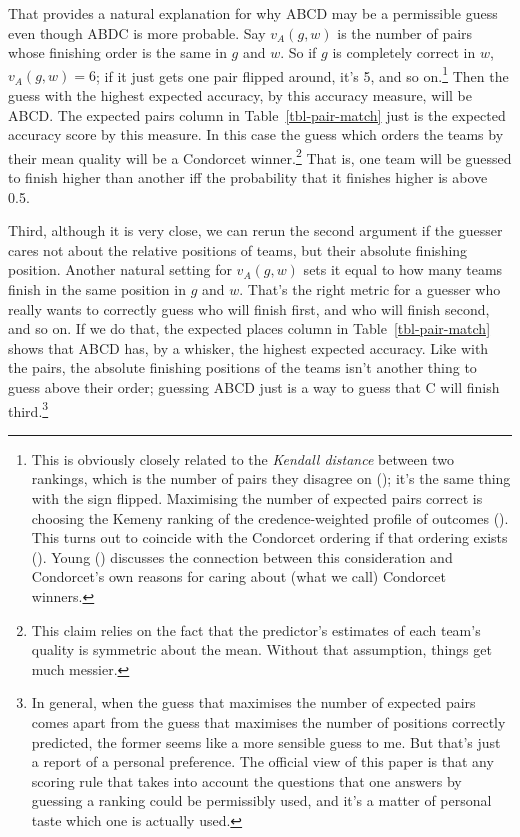 \documentclass[
  11pt,
  letterpaper,
  DIV=11,
  numbers=noendperiod,
  twoside]{scrartcl}
\begin{document}
That provides a natural explanation for why ABCD may be a permissible
guess even though ABDC is more probable. Say \(v_A(g, w)\) is the number
of pairs whose finishing order is the same in \(g\) and \(w\). So if
\(g\) is completely correct in \(w\), \(v_A(g, w) = 6\); if it just gets
one pair flipped around, it's 5, and so on.\footnote{This is obviously
  closely related to the \emph{Kendall distance} between two rankings,
  which is the number of pairs they disagree on
  (); it's the same thing with
  the sign flipped. Maximising the number of expected pairs correct is
  choosing the Kemeny ranking of the credence-weighted profile of
  outcomes (). This turns out to
  coincide with the Condorcet ordering if that ordering exists
  (). Young
  () discusses the connection between this
  consideration and Condorcet's own reasons for caring about (what we
  call) Condorcet winners.} Then the guess with the highest expected
accuracy, by this accuracy measure, will be ABCD. The expected pairs
column in Table~\ref{tbl-pair-match} just is the expected accuracy score
by this measure. In this case the guess which orders the teams by their
mean quality will be a Condorcet winner.\footnote{This claim relies on
  the fact that the predictor's estimates of each team's quality is
  symmetric about the mean. Without that assumption, things get much
  messier.} That is, one team will be guessed to finish higher than
another iff the probability that it finishes higher is above 0.5.

Third, although it is very close, we can rerun the second argument if
the guesser cares not about the relative positions of teams, but their
absolute finishing position. Another natural setting for \(v_A(g, w)\)
sets it equal to how many teams finish in the same position in \(g\) and
\(w\). That's the right metric for a guesser who really wants to
correctly guess who will finish first, and who will finish second, and
so on. If we do that, the expected places column in
Table~\ref{tbl-pair-match} shows that ABCD has, by a whisker, the
highest expected accuracy. Like with the pairs, the absolute finishing
positions of the teams isn't another thing to guess above their order;
guessing ABCD just is a way to guess that C will finish
third.\footnote{In general, when the guess that maximises the number of
  expected pairs comes apart from the guess that maximises the number of
  positions correctly predicted, the former seems like a more sensible
  guess to me. But that's just a report of a personal preference. The
  official view of this paper is that any scoring rule that takes into
  account the questions that one answers by guessing a ranking could be
  permissibly used, and it's a matter of personal taste which one is
  actually used.}
\end{document}
